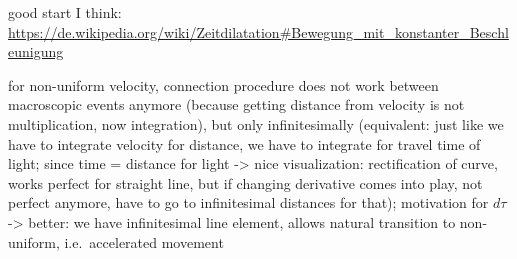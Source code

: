good start I think: \url{https://de.wikipedia.org/wiki/Zeitdilatation#Bewegung_mit_konstanter_Beschleunigung}




for non-uniform velocity, connection procedure does not work between macroscopic events anymore (because getting distance from velocity is not multiplication, now integration), but only infinitesimally (equivalent: just like we have to integrate velocity for distance, we have to integrate for travel time of light; since time = distance for light -> nice visualization: rectification of curve, works perfect for straight line, but if changing derivative comes into play, not perfect anymore, have to go to infinitesimal distances for that); motivation for $d\tau$ -> better: we have infinitesimal line element, allows natural transition to non-uniform, i.e.~accelerated movement







